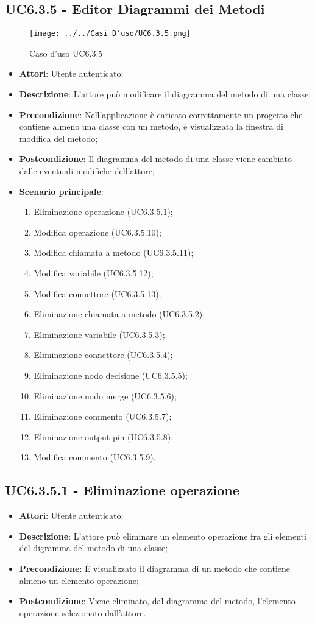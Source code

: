 \subsection{UC6.3.5 - Editor Diagrammi dei Metodi} 
\label{ssec:UC6.3.5} 
\begin{figure}[h!] 
\centering 
\texttt{[image: ../../Casi D'uso/UC6.3.5.png]} 
\caption{Caso d'uso UC6.3.5} 
 \end{figure} 
\begin{itemize} 
\item \textbf{Attori}: Utente autenticato;
\item \textbf{Descrizione}: L'attore può modificare il diagramma del metodo di una classe;
\item \textbf{Precondizione}: Nell'applicazione è caricato correttamente un progetto che  contiene almeno una classe con un metodo, è visualizzata la finestra di modifica del metodo;
\item \textbf{Postcondizione}: Il diagramma del metodo di una classe viene cambiato dalle eventuali modifiche dell'attore;
\item \textbf{Scenario principale}: \begin{enumerate}\item Eliminazione operazione (UC6.3.5.1);\item Modifica operazione (UC6.3.5.10);\item Modifica chiamata a metodo (UC6.3.5.11);\item Modifica variabile (UC6.3.5.12);\item Modifica connettore (UC6.3.5.13);\item Eliminazione chiamata a metodo (UC6.3.5.2);\item Eliminazione variabile (UC6.3.5.3);\item Eliminazione connettore (UC6.3.5.4);\item Eliminazione nodo decisione (UC6.3.5.5);\item Eliminazione nodo merge (UC6.3.5.6);\item Eliminazione commento (UC6.3.5.7);\item Eliminazione output pin (UC6.3.5.8);\item Modifica commento (UC6.3.5.9). 
 \end{enumerate}
\end{itemize} 
\subsection{UC6.3.5.1 - Eliminazione operazione} 
\label{ssec:UC6.3.5.1} 
\begin{itemize} 
\item \textbf{Attori}: Utente autenticato;
\item \textbf{Descrizione}: L'attore può eliminare un elemento operazione fra gli elementi del digramma del metodo di una classe;
\item \textbf{Precondizione}: È visualizzato il diagramma di un metodo che contiene almeno un elemento operazione;
\item \textbf{Postcondizione}: Viene eliminato, dal diagramma del metodo,  l'elemento operazione selezionato dall'attore.
\end{itemize} 
